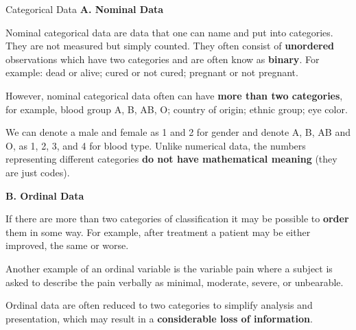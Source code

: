 \documentclass[
  ignorenonframetext,
]{beamer}
\begin{document}
\begin{frame}{Categorical Data}
\protect\hypertarget{categorical-data}{}
{\textbf{A. Nominal Data}}

Nominal categorical data are data that one can name and put into
categories. They are not measured but simply counted. They often consist
of \textbf{unordered} observations which have two categories and are
often know as \textbf{binary}. For example: {dead or alive; cured or not
cured; pregnant or not pregnant}.

However, nominal categorical data often can have \textbf{more than two
categories}, for example, {blood group A, B, AB, O; country of origin;
ethnic group; eye color}.

\begin{tcolorbox}[enhanced jigsaw, colframe=quarto-callout-important-color-frame, colback=white, rightrule=.15mm, opacitybacktitle=0.6, opacityback=0, toprule=.15mm, breakable, colbacktitle=quarto-callout-important-color!10!white, bottomtitle=1mm, bottomrule=.15mm, title=\textcolor{quarto-callout-important-color}{\faExclamation}\hspace{0.5em}{Numerical representation of categories are just codes}, left=2mm, toptitle=1mm, titlerule=0mm, coltitle=black, arc=.35mm, leftrule=.75mm]
We can denote a male and female as 1 and 2 for gender and denote A, B,
AB and O, as 1, 2, 3, and 4 for blood type. Unlike numerical data, the
numbers representing different categories \textbf{do not have
mathematical meaning} (they are just codes).
\end{tcolorbox}

{\textbf{Β. Ordinal Data}}

If there are more than two categories of classification it may be
possible to \textbf{order} them in some way. For example, {after
treatment a patient may be either improved, the same or worse}.

Another example of an ordinal variable is the variable {pain} where a
subject is asked to describe the pain verbally as {minimal, moderate,
severe, or unbearable}.

\begin{tcolorbox}[enhanced jigsaw, colframe=quarto-callout-important-color-frame, colback=white, rightrule=.15mm, opacitybacktitle=0.6, opacityback=0, toprule=.15mm, breakable, colbacktitle=quarto-callout-important-color!10!white, bottomtitle=1mm, bottomrule=.15mm, title=\textcolor{quarto-callout-important-color}{\faExclamation}\hspace{0.5em}{Collapsion of categories leads to a loss of information}, left=2mm, toptitle=1mm, titlerule=0mm, coltitle=black, arc=.35mm, leftrule=.75mm]
Ordinal data are often reduced to two categories to simplify analysis
and presentation, which may result in a \textbf{considerable loss of
information}.
\end{tcolorbox}
\end{frame}
\end{document}
